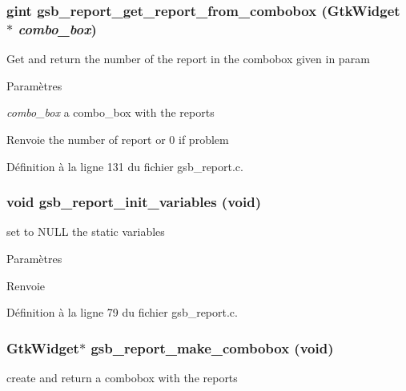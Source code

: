 \subsubsection[{gsb\_\-report\_\-get\_\-report\_\-from\_\-combobox}]{\setlength{\rightskip}{0pt plus 5cm}gint gsb\_\-report\_\-get\_\-report\_\-from\_\-combobox (GtkWidget $\ast$ {\em combo\_\-box})}\label{gsb__report_8h_a856eaa582659de20a636421f85de8b00}
Get and return the number of the report in the combobox given in param


\begin{DoxyParams}{Paramètres}
\item[{\em combo\_\-box}]a combo\_\-box with the reports\end{DoxyParams}
\begin{DoxyReturn}{Renvoie}
the number of report or 0 if problem 
\end{DoxyReturn}


Définition à la ligne 131 du fichier gsb\_\-report.c.

\subsubsection[{gsb\_\-report\_\-init\_\-variables}]{\setlength{\rightskip}{0pt plus 5cm}void gsb\_\-report\_\-init\_\-variables (void)}\label{gsb__report_8h_a9e201d1b7152dc2bc111194ec7ad2e61}
set to NULL the static variables


\begin{DoxyParams}{Paramètres}
\item[{\em }]\end{DoxyParams}
\begin{DoxyReturn}{Renvoie}

\end{DoxyReturn}


Définition à la ligne 79 du fichier gsb\_\-report.c.

\subsubsection[{gsb\_\-report\_\-make\_\-combobox}]{\setlength{\rightskip}{0pt plus 5cm}GtkWidget$\ast$ gsb\_\-report\_\-make\_\-combobox (void)}\label{gsb__report_8h_af2e1bf81ec2ee8448a590dd793bc1e9f}
create and return a combobox with the reports


